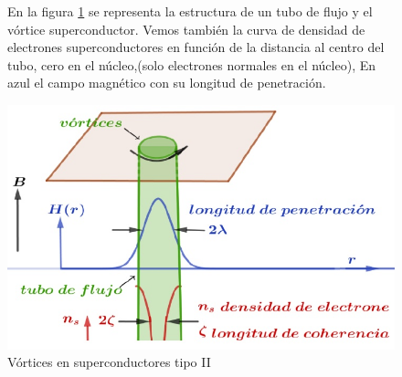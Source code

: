 \begin{figure}[H]
  \begin{minipage}[b]{0.37\textwidth}
  En la figura \ref{fig:422} se representa la estructura de un tubo de flujo y el vórtice superconductor. Vemos también la curva de densidad de electrones superconductores en función de la distancia al centro del tubo, cero en el núcleo,(solo electrones normales en el núcleo), En azul el campo magnético con su longitud de penetración.
  \vspace{1cm}
  \end{minipage}
  \hfill
  \begin{minipage}[b]{0.57\textwidth}
     \includegraphics[width=1.0\textwidth]{./Figures/fig422}
     \caption{Vórtices en superconductores tipo II}
	\label{fig:422}
  \end{minipage}
\end{figure}



